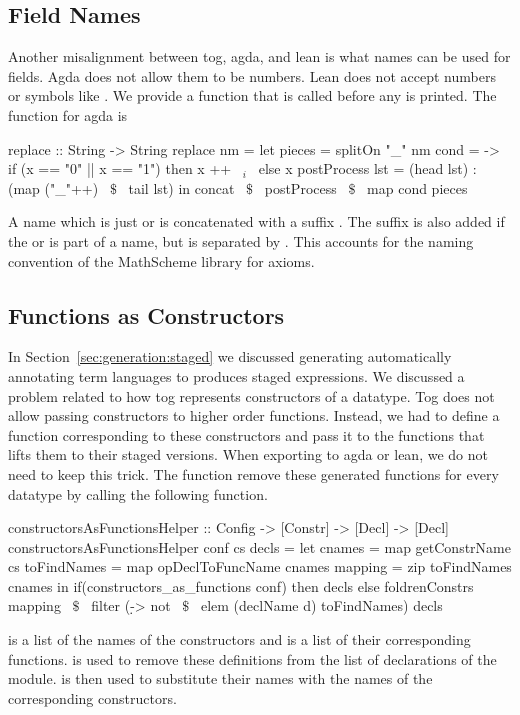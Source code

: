 \subsection{Field Names}
Another misalignment between tog, agda, and lean is what names can be used for fields. Agda does not allow them to be numbers. Lean does not accept numbers or symbols like \lstmath{+, *, \|>, <\|}. 
We provide a function  that is called before any  is printed. The  function for agda is 
\begin{hscode}
replace :: String -> String
replace nm =
  let pieces = splitOn "_" nm
      cond = \x -> if (x == "0" || x == "1") then x ++ ~$_i$~ else x
      postProcess lst = (head lst) : (map ("_"++) ~$\$$~ tail lst)
  in concat ~$\$$~ postProcess ~$\$$~ map cond pieces 
\end{hscode}
A name which is just  or  is concatenated with a suffix . The suffix is also added if the  or  is part of a name, but is separated by \lstmath{_}. This accounts for the naming convention of the MathScheme library for axioms. 

\subsection{Functions as Constructors}
In Section~\ref{sec:generation:staged} we discussed generating automatically annotating term languages to produces staged expressions. We discussed a problem related to how tog represents constructors of a datatype. Tog does not allow passing constructors to higher order functions. Instead, we had to define a function corresponding to these constructors and pass it to the functions that lifts them to their staged versions. When exporting to agda or lean, we do not need to keep this trick. The function  remove these generated functions for every datatype by calling the following function. 
\begin{hscode} 
constructorsAsFunctionsHelper :: Config -> [Constr] -> [Decl] -> [Decl] 
constructorsAsFunctionsHelper conf cs decls =
  let cnames = map getConstrName cs
      toFindNames = map opDeclToFuncName cnames 
      mapping = zip toFindNames cnames
  in if(constructors_as_functions conf) then decls 
      else foldrenConstrs mapping ~$\$$~ 
               filter (\d -> not  ~$\$$~  elem (declName d) toFindNames) decls     
\end{hscode} 
 is a list of the names of the constructors and  is a list of their corresponding functions.  is used to remove these definitions from the list of declarations of the module.  is then used to substitute their names with the names of the corresponding constructors. 

